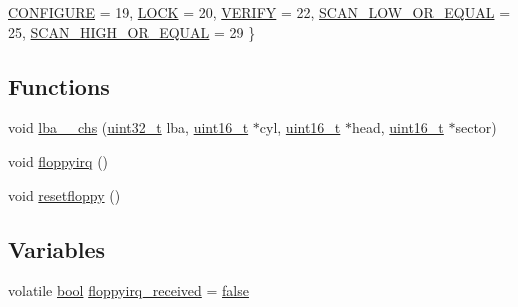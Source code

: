 \begin{DoxyCompactItemize}
\hyperlink{a00017_a9990a5de334fdaec2ce93b74b8676148_a9990a5de334fdaec2ce93b74b8676148a5183723f609e1521f38450e9792af61d}{C\+O\+N\+F\+I\+G\+U\+RE} = 19, 
\hyperlink{a00017_a9990a5de334fdaec2ce93b74b8676148_a9990a5de334fdaec2ce93b74b8676148a438b68412f24003b09e0993b62dc7b48}{L\+O\+CK} = 20, 
\hyperlink{a00017_a9990a5de334fdaec2ce93b74b8676148_a9990a5de334fdaec2ce93b74b8676148a570b000ad5bd233482644aaaac095680}{V\+E\+R\+I\+FY} = 22, 
\hyperlink{a00017_a9990a5de334fdaec2ce93b74b8676148_a9990a5de334fdaec2ce93b74b8676148a7eefaec5fabe1db94fd12a84af66b6cd}{S\+C\+A\+N\+\_\+\+L\+O\+W\+\_\+\+O\+R\+\_\+\+E\+Q\+U\+AL} = 25, 
\newline
\hyperlink{a00017_a9990a5de334fdaec2ce93b74b8676148_a9990a5de334fdaec2ce93b74b8676148a1ee024a89ac2dbd7845f63306f175546}{S\+C\+A\+N\+\_\+\+H\+I\+G\+H\+\_\+\+O\+R\+\_\+\+E\+Q\+U\+AL} = 29
 \}
\end{DoxyCompactItemize}
\subsection*{Functions}
\begin{DoxyCompactItemize}
\item 
void \hyperlink{a00017_a782ff57a4ec7786197ec3a12d4f52332_a782ff57a4ec7786197ec3a12d4f52332}{lba\+\_\+\_\+chs} (\hyperlink{a00101_a435d1572bf3f880d55459d9805097f62_a435d1572bf3f880d55459d9805097f62}{uint32\+\_\+t} lba, \hyperlink{a00101_a273cf69d639a59973b6019625df33e30_a273cf69d639a59973b6019625df33e30}{uint16\+\_\+t} $\ast$cyl, \hyperlink{a00101_a273cf69d639a59973b6019625df33e30_a273cf69d639a59973b6019625df33e30}{uint16\+\_\+t} $\ast$head, \hyperlink{a00101_a273cf69d639a59973b6019625df33e30_a273cf69d639a59973b6019625df33e30}{uint16\+\_\+t} $\ast$sector)
\item 
void \hyperlink{a00017_acbe17688655526c3fa02f324ae8336ca_acbe17688655526c3fa02f324ae8336ca}{floppyirq} ()
\item 
void \hyperlink{a00017_ad64d38a767bc5f30a3e13a5b01b9cf35_ad64d38a767bc5f30a3e13a5b01b9cf35}{resetfloppy} ()
\end{DoxyCompactItemize}
\subsection*{Variables}
\begin{DoxyCompactItemize}
\item 
volatile \hyperlink{a00101_af6a258d8f3ee5206d682d799316314b1_af6a258d8f3ee5206d682d799316314b1}{bool} \hyperlink{a00017_a2cfa75d25a7da8cb54551c7840e80d40_a2cfa75d25a7da8cb54551c7840e80d40}{floppyirq\+\_\+received} = \hyperlink{a00101_af6a258d8f3ee5206d682d799316314b1_af6a258d8f3ee5206d682d799316314b1ae9de385ef6fe9bf3360d1038396b884c}{false}
\end{DoxyCompactItemize}



